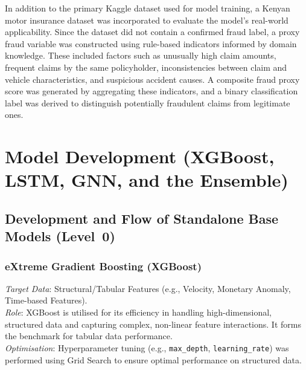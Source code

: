 \documentclass[12pt,a4paper,oneside]{report}
\numberwithin{equation}{chapter}
\begin{document}
In addition to the primary Kaggle dataset used for model training, a Kenyan motor insurance
dataset was incorporated to evaluate the model's real-world applicability. Since the dataset did
not contain a confirmed fraud label, a proxy fraud variable was constructed using rule-based
indicators informed by domain knowledge. These included factors such as unusually high claim
amounts, frequent claims by the same policyholder, inconsistencies between claim and vehicle
characteristics, and suspicious accident causes. A composite fraud proxy score was generated by
aggregating these indicators, and a binary classification label was derived to distinguish
potentially fraudulent claims from legitimate ones.

\section{Model Development (XGBoost, LSTM, GNN, and the Ensemble)}

\subsection{Development and Flow of Standalone Base Models (Level~0)}

\subsubsection{eXtreme Gradient Boosting (XGBoost)}

\sloppy
\textit{Target Data}: Structural/Tabular Features (e.g., Velocity, Monetary Anomaly, Time-based Features).\\
\textit{Role}: XGBoost is utilised for its efficiency in handling high-dimensional, structured data and capturing complex, non-linear feature interactions. It forms the benchmark for tabular data performance.\\
\textit{Optimisation}: Hyperparameter tuning (e.g., \texttt{max\_depth}, \texttt{learning\_rate}) was performed using Grid Search to ensure optimal performance on structured data.
\newpage

\end{document}
